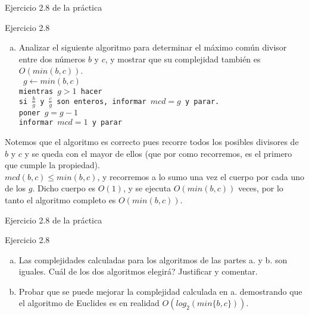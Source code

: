 \documentclass[compress]{beamer}
\newcommand{\tabu}{\hspace*{0.7cm}}
\newcommand{\htabu}{\hspace*{0.25cm}}
\begin{document}
\begin{frame}{Ejercicio 2.8 de la pr\'actica}
\begin{block}{Ejercicio 2.8}
\begin{enumerate}[b.]
\item Analizar el siguiente algoritmo para determinar el m\'aximo com\'un divisor entre dos n\'umeros $b$ y $c$, y
mostrar que su complejidad tambi\'en es $O(min(b,c))$. \\ \bigskip
\texttt{ \small 
$g \leftarrow min(b,c)$ \\
\htabu mientras $g > 1$ hacer \\
\htabu \tabu si $\frac{b}{g}$ y $\frac{c}{g}$ son enteros, informar $mcd = g$ y parar. \\
\htabu \tabu poner $g = g-1$ \\
\htabu informar $mcd = 1$ y parar}
\end{enumerate}
\end{block}  
\end{frame}

\begin{frame}
Notemos que el algoritmo es correcto pues recorre todos los posibles divisores de $b$ y $c$ y se queda con el mayor de ellos (que por como recorremos, es el primero
que cumple la propiedad).\\ \bigskip $mcd(b,c) \leq min(b,c)$, y recorremos a lo sumo una vez el cuerpo por cada uno de los $g$. Dicho cuerpo es $O(1)$, y se ejecuta $O(min(b,c))$
veces, por lo tanto el algoritmo completo es $O(min(b,c))$.
\end{frame}

\begin{frame}{Ejercicio 2.8 de la pr\'actica}
\begin{block}{Ejercicio 2.8}
\begin{enumerate}[c.]
\item Las complejidades calculadas para los algoritmos de las partes a. y b. son iguales. \textquestiondown Cu\'al de los dos algoritmos elegir\'a? Justificar y comentar.
\item Probar que se puede mejorar la complejidad calculada en a. demostrando que el algoritmo de Euclides
es en realidad $O(log_2(min\{b, c\}))$.
\end{enumerate}
\end{block} 
\end{frame}
\end{document}
